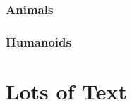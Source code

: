 \documentclass[a4paper,openany]{book}
\begin{document}
\begin{multicols}{2}

\subsection{Animals}

\nurahorse

\nuracrab

\nuracat

\nuraslug

\nuraspider

\nurawolf

\subsection{Humanoids}

\goblin

\goblinnuramancer

\hobgoblin

\ogre

\end{multicols}


\chapter{Lots of Text}

\begin{multicols}{2}

\noindent
\lipsum

\end{multicols}
\end{document}

